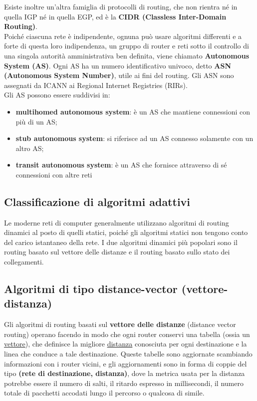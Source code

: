 \documentclass{article}
\begin{document}
            Esiste inoltre un’altra famiglia di protocolli di routing, che non rientra né in quella IGP né in
            quella EGP, ed è la \textbf{CIDR (Classless Inter-Domain Routing)}.\\

            Poiché ciascuna rete è indipendente, ognuna può usare algoritmi differenti e a forte di questa
            loro indipendenza, un gruppo di router e reti sotto il controllo di una singola autorità
            amministrativa ben definita, viene chiamato \textbf{Autonomous System (AS)}. Ogni AS ha un numero
            identificativo univoco, detto \textbf{ASN (Autonomous System Number)}, utile ai fini del routing. Gli
            ASN sono assegnati da ICANN ai Regional Internet Registries (RIRs).\\
            
            Gli AS possono essere suddivisi in:

            \begin{itemize}
                \item \textbf{multihomed autonomous system}: è un AS che mantiene connessioni con più di un AS;
                \item \textbf{stub autonomous system}: si riferisce ad un AS connesso solamente con un altro AS;
                \item \textbf{transit autonomous system}: è un AS che fornisce attraverso di sé connessioni con altre
                reti
            \end{itemize}

        \subsection{Classificazione di algoritmi adattivi}
        Le moderne reti di computer generalmente utilizzano algoritmi di routing dinamici al posto di
        quelli statici, poiché gli algoritmi statici non tengono conto del carico istantaneo della rete.
        I due algoritmi dinamici più popolari sono il routing basato sul vettore delle distanze e il routing
        basato sullo stato dei collegamenti.

        \subsection{Algoritmi di tipo distance-vector (vettore-distanza)}
        Gli algoritmi di routing basati sul \textbf{vettore delle distanze} (distance vector routing) operano
        facendo in modo che ogni router conservi una tabella (ossia un \underline{vettore}), che definisce la
        migliore \underline{distanza} conosciuta per ogni destinazione e la linea che conduce a tale destinazione.
        Queste tabelle sono aggiornate scambiando informazioni con i router vicini, e gli aggiornamenti
        sono in forma di coppie del tipo \textbf{(rete di destinazione, distanza)}, dove la metrica usata per la
        distanza potrebbe essere il numero di salti, il ritardo espresso in millisecondi, il numero totale
        di pacchetti accodati lungo il percorso o qualcosa di simile.
\end{document}
